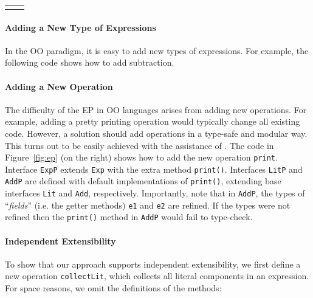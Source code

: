 \begin{figure*}
\centering
\saveSpaceFig
\begin{tabular}{l|l}
&
\end{tabular}
\caption{The Expression Problem (left: initial system, right: code for adding
  print operation).}\label{fig:ep}
\end{figure*}%

\paragraph{Adding a New Type of Expressions}
In the OO paradigm, it is easy to add new types of expressions. For example, the
following code shows how to add subtraction.


\paragraph{Adding a New Operation} The difficulty of the EP in OO
languages arises from adding new operations. For example, adding a pretty printing
operation would typically change all existing code. However, a solution
should add operations in a type-safe and modular way. This
turns out to be easily achieved with the assistance of \mixin.  The code in
Figure~\ref{fig:ep} (on the right) shows how to add the new operation \texttt{print}.
Interface \texttt{ExpP} extends \texttt{Exp} with the extra method
\texttt{print()}. Interfaces \texttt{LitP} and \texttt{AddP} are defined with
default implementations of \texttt{print()}, extending base interfaces
\texttt{Lit} and \texttt{Add}, respectively. Importantly, note that in
\texttt{AddP}, the types of ``\emph{fields}'' (i.e. the getter methods)
\texttt{e1} and \texttt{e2} are refined. If the types were not refined then
the \texttt{print()} method in \texttt{AddP} would fail to type-check.

\paragraph{Independent Extensibility}
To show that our approach supports independent extensibility, we first define a
new operation \texttt{collectLit}, which collects all
literal components in an expression. For space reasons,
we omit the definitions of the methods:

